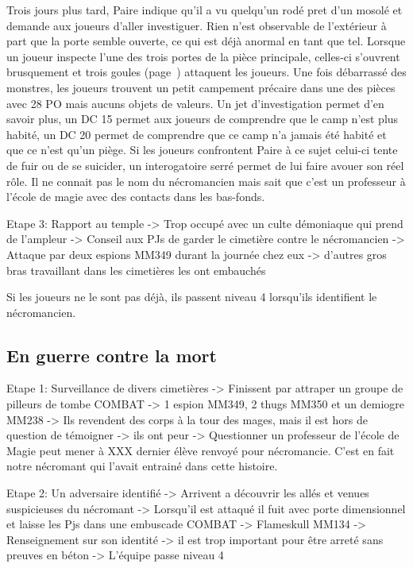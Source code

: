 Trois jours plus tard, Paire indique qu'il a vu quelqu'un rodé pret d'un mosolé et demande aux joueurs 
d'aller investiguer. Rien n'est observable de l'extérieur à part que la porte semble ouverte, ce qui est
déjà anormal en tant que tel. Lorsque un joueur inspecte l'une des trois portes de la pièce principale, 
celles-ci s'ouvrent brusquement et trois goules (page~\pageref{}) attaquent les joueurs. Une fois débarrassé
des monstres, les joueurs trouvent un petit campement précaire dans une des pièces avec 28 PO mais aucuns
objets de valeurs. Un jet d'investigation permet d'en savoir plus, un DC 15 permet aux joueurs de comprendre
que le camp n'est plus habité, un DC 20 permet de comprendre que ce camp n'a jamais été habité et que ce 
n'est qu'un piège. Si les joueurs confrontent Paire à ce sujet celui-ci tente de fuir ou de se suicider,
un interogatoire serré permet de lui faire avouer son réel rôle. Il ne connait pas le nom du nécromancien
mais sait que c'est un professeur à l'école de magie avec des contacts dans les bas-fonds.



Etape 3: Rapport au temple
 -> Trop occupé avec un culte démoniaque qui prend de l'ampleur
 -> Conseil aux PJs de garder le cimetière contre le nécromancien
 -> Attaque par deux espions MM349 durant la journée chez eux -> d'autres gros bras travaillant dans les cimetières les ont embauchés

Si les joueurs ne le sont pas déjà, ils passent niveau 4 lorsqu'ils identifient le nécromancien.

\subsection{En guerre contre la mort}

Etape 1: Surveillance de divers cimetières
 -> Finissent par attraper un groupe de pilleurs de tombe COMBAT -> 1 espion MM349, 2 thugs MM350 et un demiogre MM238 
 -> Ils revendent des corps à la tour des mages, mais il est hors de question de témoigner -> ils ont peur
 -> Questionner un professeur de l'école de Magie peut mener à XXX dernier élève renvoyé pour nécromancie. C'est en fait notre nécromant qui l'avait entrainé dans cette histoire.

Etape 2: Un adversaire identifié
 -> Arrivent a découvrir les allés et venues suspicieuses du nécromant
 -> Lorsqu'il est attaqué il fuit avec porte dimensionnel et laisse les Pjs dans une embuscade COMBAT -> Flameskull MM134
 -> Renseignement sur son identité -> il est trop important pour être arreté sans preuves en béton
 -> L'équipe passe niveau 4

